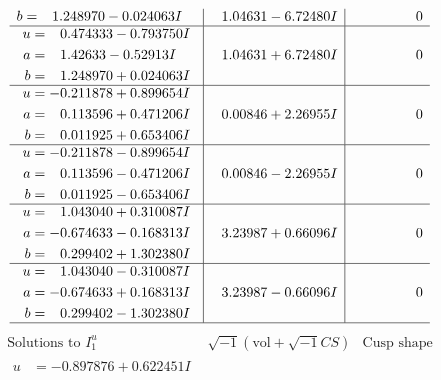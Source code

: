 \documentclass[1p]{elsarticle_modified}
\theoremstyle{definition}
\newcommand{\I}{\sqrt{-1}}
\begin{document}
$$\begin{array}{c|c|c}
\begin{aligned}
b &= \phantom{-}1.248970 - 0.024063 I\end{aligned}
 & \phantom{-}1.04631 - 6.72480 I & \phantom{-0.000000 } 0 \\ \hline\begin{aligned}
u &= \phantom{-}0.474333 - 0.793750 I \\
a &= \phantom{-}1.42633 - 0.52913 I \\
b &= \phantom{-}1.248970 + 0.024063 I\end{aligned}
 & \phantom{-}1.04631 + 6.72480 I & \phantom{-0.000000 } 0 \\ \hline\begin{aligned}
u &= -0.211878 + 0.899654 I \\
a &= \phantom{-}0.113596 + 0.471206 I \\
b &= \phantom{-}0.011925 + 0.653406 I\end{aligned}
 & \phantom{-}0.00846 + 2.26955 I & \phantom{-0.000000 } 0 \\ \hline\begin{aligned}
u &= -0.211878 - 0.899654 I \\
a &= \phantom{-}0.113596 - 0.471206 I \\
b &= \phantom{-}0.011925 - 0.653406 I\end{aligned}
 & \phantom{-}0.00846 - 2.26955 I & \phantom{-0.000000 } 0 \\ \hline\begin{aligned}
u &= \phantom{-}1.043040 + 0.310087 I \\
a &= -0.674633 - 0.168313 I \\
b &= \phantom{-}0.299402 + 1.302380 I\end{aligned}
 & \phantom{-}3.23987 + 0.66096 I & \phantom{-0.000000 } 0 \\ \hline\begin{aligned}
u &= \phantom{-}1.043040 - 0.310087 I \\
a &= -0.674633 + 0.168313 I \\
b &= \phantom{-}0.299402 - 1.302380 I\end{aligned}
 & \phantom{-}3.23987 - 0.66096 I & \phantom{-0.000000 } 0\\
 \hline 
 \end{array}$$\newpage$$\begin{array}{c|c|c}  
\text{Solutions to }I^u_{1}& \I (\text{vol} + \sqrt{-1}CS) & \text{Cusp shape}\\
 \hline 
\begin{aligned}
u &= -0.897876 + 0.622451 I \\

\end{aligned}
\end{array}$$
\end{document}

